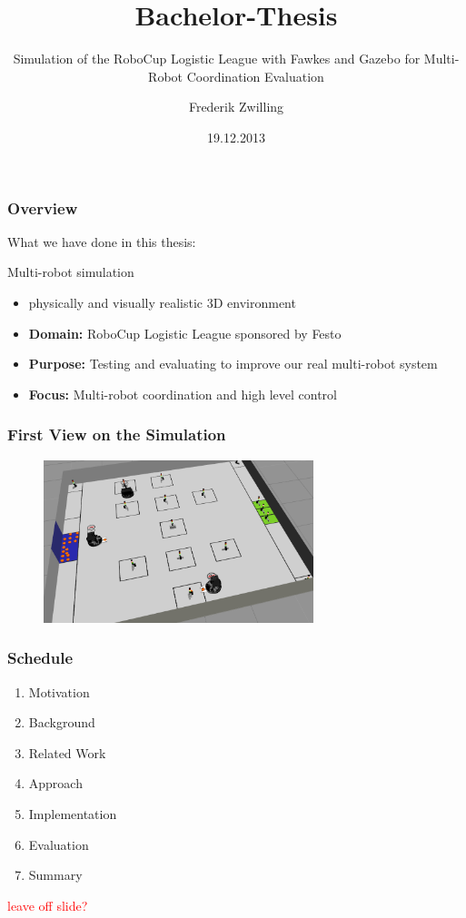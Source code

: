 \documentclass[]{beamer}
\title{Bachelor-Thesis}
\subtitle{Simulation of the RoboCup Logistic League with Fawkes and Gazebo for Multi-Robot Coordination Evaluation}
\author {Frederik Zwilling}
\institute{RWTH Aachen}
\date{19.12.2013}
\begin{document}
\frame{\titlepage}

\begin{frame}
  \frametitle{Overview}
  What we have done in this thesis:\\
  \begin{block}{Multi-robot simulation}
    \begin{itemize}
    \item physically and visually realistic 3D environment
    \item \textbf{Domain:} RoboCup Logistic League sponsored by Festo
    \item \textbf{Purpose:} Testing and evaluating to improve our real multi-robot system
    \item \textbf{Focus:} Multi-robot coordination and high level control
    \end{itemize}
  \end{block}
\end{frame}

\begin{frame}
  \frametitle{First View on the Simulation}

  \begin{figure}
    \includegraphics[width=0.7\textwidth]{../pics/sim_working.png}\\
  \end{figure}
\end{frame}

\begin{frame}
  \frametitle{Schedule}
  \begin{enumerate}
  \item Motivation
  \item Background
  \item Related Work
  \item Approach
  \item Implementation
  \item Evaluation
  \item Summary
  \end{enumerate}
  \textcolor{red}{leave off slide?}
\end{frame}
\end{document}
